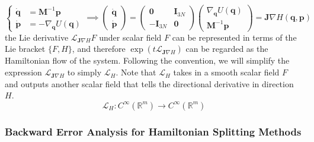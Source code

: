 \documentclass{article}
\begin{document}
      \begin{equation}
        \begin{cases} \boldsymbol{\dot{q}} & = \mathbf{M}^{-1} \mathbf{p} \\
        \boldsymbol{\dot{p}} & = - \nabla_\mathbf{q} U(\mathbf{q}) \end{cases} \implies \begin{pmatrix} \boldsymbol{\dot{q}} \\ \boldsymbol{\dot{p}} \end{pmatrix} = \begin{pmatrix} \mathbf{0} & \mathbf{I}_{3N} \\ -\mathbf{I}_{3N} & \mathbf{0} \end{pmatrix} \begin{pmatrix} \nabla_\mathbf{q} U (\mathbf{q})\\ \mathbf{M}^{-1} \mathbf{p} \end{pmatrix} = \mathbf{J} \nabla H(\mathbf{q}, \mathbf{p})
      \end{equation}
      the Lie derivative $\mathcal{L}_{\mathbf{J} \nabla H} F$ under scalar field $F$ can be represented in terms of the Lie bracket $\{F, H\}$, and therefore $\exp(t \mathcal{L}_{\mathbf{J} \nabla H})$ can be regarded as the Hamiltonian flow of the system. Following the convention, we will simplify the expression $\mathcal{L}_{\mathbf{J} \nabla H}$ to simply $\mathcal{L}_H$. Note that $\mathcal{L}_H$ takes in a smooth scalar field $F$ and outputs another scalar field that tells the directional derivative in direction $H$. 
      \begin{equation}
        \mathcal{L}_H: C^\infty (\mathbb{R}^m) \longrightarrow C^\infty (\mathbb{R}^m)
      \end{equation}

    \subsubsection{Backward Error Analysis for Hamiltonian Splitting Methods}
\end{document}
